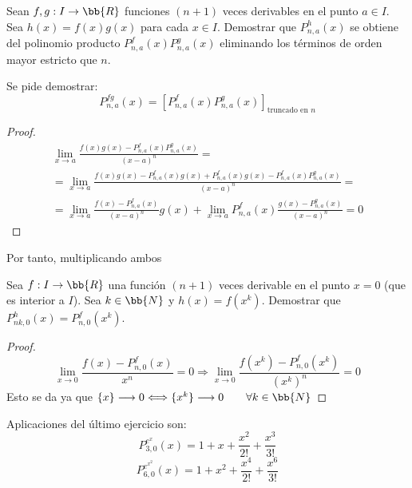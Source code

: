 \begin{ejercicio}
    Sean $f,g:I\to \bb{R}$ funciones $(n+1)$ veces derivables en el punto $a\in I$. Sea $h(x)=f(x)g(x)$ para cada $x\in I$. Demostrar que $P_{n,a}^h(x)$ se obtiene del polinomio producto $P_{n,a}^f(x)P_{n,a}^g(x)$ eliminando los términos de orden mayor estricto que $n$.

    Se pide demostrar:
    $$P_{n,a}^{fg}(x) = \left[P_{n,a}^{f}(x) P_{n,a}^{g}(x) \right]_{\text{truncado en } n}$$

    \begin{proof}
        \begin{multline*}
            \lim_{x\to a} \frac{f(x)g(x) - P_{n,a}^{f}(x) P_{n,a}^{g}(x)}{(x-a)^n}
            =\\
            = \lim_{x\to a} \frac{f(x)g(x) - P_{n,a}^{f}(x)g(x)  + P_{n,a}^{f}(x)g(x) - P_{n,a}^{f}(x)P_{n,a}^{g}(x)}{(x-a)^n}
            =\\=
            \lim_{x\to a}\frac{f(x) - P_{n,a}^f(x)}{(x-a)^n}g(x) + \lim_{x\to a}P_{n,a}^f(x) \frac{g(x) - P_{n,a}^g(x)}{(x-a)^n} = 0
        \end{multline*}
    \end{proof}

    Por tanto, multiplicando ambos 
\end{ejercicio}

\begin{ejercicio}
    Sea $f:I\to \bb{R}$ una función $(n+1)$ veces derivable en el punto $x=0$ (que es interior a $I$). Sea $k\in \bb{N}$ y $h(x) = f(x^k)$. Demostrar que $P_{nk, 0}^h(x) = P_{n,0}^f(x^k)$.

    \begin{proof}
        \begin{equation*}
            \lim_{x\to 0} \frac{f(x) - P_{n,0}^f(x)}{x^n} = 0 \Longrightarrow
            \lim_{x\to 0} \frac{f(x^k) - P_{n,0}^f(x^k)}{(x^k)^n} = 0
        \end{equation*}
        Esto se da ya que $\{x\}\longrightarrow 0 \Longleftrightarrow \{x^k\} \longrightarrow 0 \qquad \forall k \in \bb{N}$
    \end{proof}
    
    \begin{ejemplo} Aplicaciones del último ejercicio son:
        \begin{equation*}
            P_{3,0}^{e^x} (x) = 1 + x + \frac{x^2}{2!} + \frac{x^3}{3!}
        \end{equation*}
        \begin{equation*}
            P_{6,0}^{e^{x^2}} (x) = 1 + x^2 + \frac{x^4}{2!} + \frac{x^6}{3!}
        \end{equation*}
    \end{ejemplo}
\end{ejercicio}

